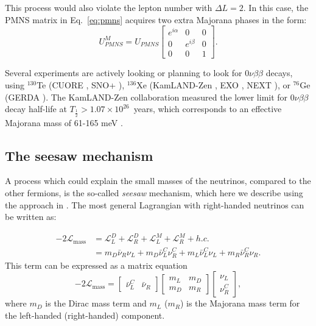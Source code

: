 This process would also violate the lepton number with $\Delta L = 2$. In this case, the PMNS matrix in Eq.~\ref{eq:pmns} acquires two extra Majorana phases in the form:
\begin{equation}
    U_{PMNS}^M = U_{PMNS} \begin{bmatrix}
    e^{i\alpha} & 0 & 0 \\
    0 & e^{i\beta} & 0 \\
    0 & 0 & 1
    \end{bmatrix}.
\end{equation}

Several experiments are actively looking or planning to look for $0\nu\beta\beta$ decays, using $^{130}$Te (CUORE \cite{Arnaboldi:2002du}, SNO+ \cite{Andringa:2015tza}), $^{136}$Xe (KamLAND-Zen \cite{KamLAND-Zen:2016pfg}, EXO \cite{Auger:2012ar}, NEXT \cite{Alvarez:2012flf}), or $^{76}$Ge (GERDA \cite{Agostini:2013mzu}). 
The KamLAND-Zen collaboration measured the lower limit for $0\nu\beta\beta$ decay half-life at $T_{\frac{1}{2}} > 1.07\times10^{26}$~years, which corresponds to an effective Majorana mass of 61-165 meV \cite{KamLAND-Zen:2016pfg}.

\subsection{The seesaw mechanism}\label{sec:seesaw}
A process which could explain the small masses of the neutrinos, compared to the other fermions, is the so-called \emph{seesaw} mechanism, which here we describe using the approach in \cite{Grossman:2003eb}. 
The most general Lagrangian with right-handed neutrinos can be written as:

\begin{align}
    -2\mathcal{L}_{\mathrm{mass}} & = \mathcal{L}^D_L + \mathcal{L}^D_R + \mathcal{L}^M_L + \mathcal{L}^M_R + h.c. \\
    & = m_D \bar{\nu}_R \nu_L + m_D \bar{\nu}^C_L\nu^C_R + m_L\bar{\nu}_L^C\nu_L + m_R \bar{\nu}_R^C\nu_R.
\end{align}
This term can be expressed as a matrix equation 
\begin{equation}
    -2\mathcal{L_\mathrm{mass}} = \begin{bmatrix}
    \bar{\nu}_L^C & \bar{\nu}_R
    \end{bmatrix}\begin{bmatrix}
    m_L & m_D \\
    m_D & m_R
    \end{bmatrix}\begin{bmatrix}
    \nu_L \\ \nu_R^C
    \end{bmatrix},
\end{equation}
where $m_D$ is the Dirac mass term and $m_L$ ($m_R$) is the Majorana mass term for the left-handed (right-handed) component. 

